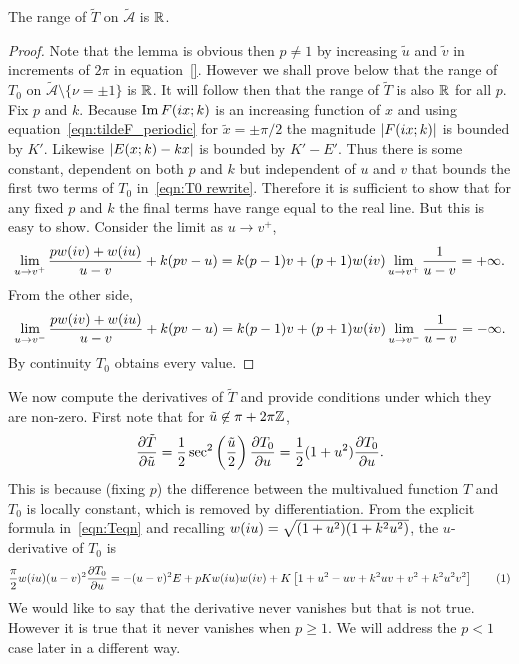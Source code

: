 \documentclass{article}
\begin{document}
\begin{lem}
\label{lem:range_T}
The range of $\tilde{T}$ on $\mathcal{\tilde{A}}$ is $\mathbb{R}$.

\begin{proof}
Note that the lemma is obvious then $p\neq 1$ by increasing $\tilde{u}$ and $\tilde{v}$ in increments of $2\pi$ in equation~\ref{}. However we shall prove below that the range of $T_0$ on $\mathcal{\tilde{A}} \setminus \{\nu = \pm 1\}$ is $\mathbb{R}$. It will follow then that the range of $\tilde{T}$ is also $\mathbb{R}$ for all $p$. Fix $p$ and $k$. Because $\operatorname{Im} F(i x;k)$ is an increasing function of $x$ and using equation~\ref{eqn:tildeF_periodic} for $\tilde{x}=\pm\pi/2$ the magnitude $\left|F(i x;k)\right|$ is bounded by $K'$. Likewise $\left|E(x;k) - kx\right|$ is bounded by $K'-E'$. Thus there is some constant, dependent on both $p$ and $k$ but independent of $u$ and $v$ that bounds the first two terms of $T_0$ in~\eqref{eqn:T0 rewrite}.
Therefore it is sufficient to show that for any fixed $p$ and $k$ the final terms have range equal to the real line. But this is easy to show. Consider the limit as $u \to v^+$,
\[
\lim_{u \to v^+} \frac{pw(i v) + w(i u)}{u-v} + k(pv-u)
= k(p-1)v + (p+1) w(i v)\lim_{u \to v^+} \frac{1}{u-v} = +\infty.
\]
From the other side,
\[
\lim_{u \to v^-} \frac{pw(i v) + w(i u)}{u-v} + k(pv-u)
= k(p-1)v + (p+1) w(i v)\lim_{u \to v^-} \frac{1}{u-v} = -\infty.
\]
By continuity $T_0$ obtains every value.
\end{proof}
\end{lem}


We now compute the derivatives of $\tilde{T}$ and provide conditions under which they are non-zero. First note that for $\tilde{u} \not\in \pi + 2\pi\mathbb{Z}$,
\[
\frac{\partial \tilde{T}}{\partial \tilde{u}} 
= \frac{1}{2}\sec^2\left(\frac{\tilde{u}}{2}\right) \frac{\partial T_0}{\partial u}
= \frac{1}{2}(1+u^2) \frac{\partial T_0}{\partial u}.
\] 
This is because (fixing $p$) the difference between the multivalued function $T$ and $T_0$ is locally constant, which is removed by differentiation.
From the explicit formula in~\eqref{eqn:Teqn} and recalling $w(i u) = \sqrt{(1+u^2)(1+k^2 u^2)}$, the $u$-derivative of $T_0$ is
\[
\frac{\pi}{2}w(\iu u)(u-v)^2\Partial{T_0}{u}
= -(u-v)^2 E + pKw(\iu u)w(\iu v) + K\left[ 1 + u^2 - uv + k^2 uv + v^2 + k^2 u^2 v^2 \right]
\labelthis{eqn:dTdu}
\]
We would like to say that the derivative never vanishes but that is not true. However it is true that it never vanishes when $p \geq 1$. We will address the $p < 1$ case later in a different way.
\end{document}
